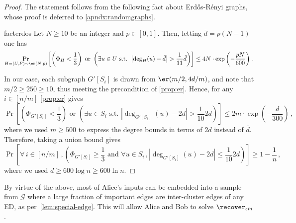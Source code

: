 \begin{proof}
	The statement follows from the following fact about Erd\H{o}s-R\'{e}nyi graphs, whose proof is deferred to \cref{apndx:randomgraphs}.
	\begin{restatable}{fact}{erdos}
		\label{prop:er}
		Let $N \ge 10$ be an integer and $p \in [0,1]$. Then, letting $\bar{d} = p(N-1)$ one has
		\begin{equation*}
			\Pr_{H=(U,F) \sim \er(N,p)}\left[\left(\Phi_H < \frac{1}{3} \right)\text{ or } \left(\exists u \in U \text{ s.t. } \left|\deg_H(u)-\bar{d}\right|>\frac{1}{11} \bar{d}\right)\right] \le 4N \cdot \exp\left(-\frac{pN}{600}\right) \, .
		\end{equation*}
	\end{restatable}
	
	\noindent
	In our case, each subgraph $G'[S_i]$ is drawn from $\er({m}/{2}, 4d/m)$, and note that $m/2 \ge 250 \ge 10$, thus meeting the precondition of \cref{prop:er}. Hence, for any $i \in [n/m]$ \cref{prop:er} gives
	\begin{equation*}
		\Pr\left[\left(\Phi_{G'[S_i]} < \frac{1}{3}\right) \text{ or } \left(\exists u \in S_i \text{ s.t. } \left|\deg_{G'[S_i]}(u)-2d\right|>\frac{1}{10}2d\right)\right] \le 2m \cdot \exp\left(-\frac{d}{300}\right) \, ,
	\end{equation*}
	where we used $m \ge 500$ to express the degree bounds in terms of $2d$ instead of $\bar{d}$.
	Therefore, taking a union bound gives
	\begin{equation*}
		\Pr\left[\forall \, i \in [n/m]\, , \left( \Phi_{G'[S_i]} \ge \frac{1}{3} \text{ and } \forall u \in S_i\, , \left|\deg_{G'[S_i]}(u)-2d\right|\le\frac{1}{10} 2d\right)\right] \ge1- \frac{1}{n} \, ,
	\end{equation*}
	where we used $d \ge 600 \log n \ge 600 \ln n$.
\end{proof}
\noindent
By virtue of the above, most of Alice's inputs  can be embedded into a sample from $\mathcal{G}$ where a large fraction of important edges are inter-cluster edges of any ED, as per~\cref{lem:special-edge}. This will allow Alice and Bob to solve $\recover_{\epsilon m}$.

